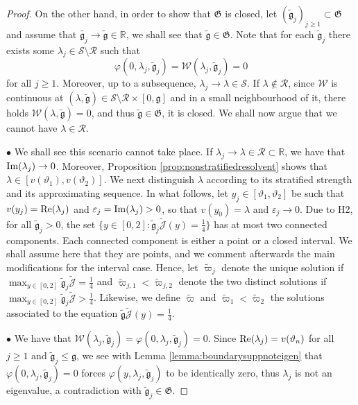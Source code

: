 \documentclass[11pt,reqno]{amsproc}
\newcommand{\bullpar}[1]{\vspace{.5em}\noindent $\bullet$ \normalfont {\bfseries #1.}}
\newcommand{\bullsubpar}[1]{\vspace{.5em} $\bullet$ \normalfont {\bfseries #1.}}
\theoremstyle{definition}
\numberwithin{equation}{section}
\newcommand{\cJ}{{\mathcal{J}}}
\newcommand{\R}{{\mathbb R}}
\newcommand{\ep}{\varepsilon}
\newcommand{\g}{{\mathfrak{g}}}
\def\Re{{\rm Re}}
\def\Im{{\rm Im}}
\begin{document}
\begin{proof}
On the other hand, in order to show that $\mathfrak{G}$ is closed, let $(\tilde{\g}_j)_{j\geq1}\subset \mathfrak{G}$ and assume that $\tilde{\g_j}\rightarrow\tilde{\g}\in \R$, we shall see that $\tilde{\g}\in \mathfrak{G}$. Note that for each $\tilde{\g}_j$ there exists some $\lambda_j\in \mathcal{S}\setminus\mathcal{R}$ such that 
\begin{equation}\label{eq:vanishingvarphilambdaj}
\varphi(0,\lambda_j, \tilde\g_j) = \mathcal{W}(\lambda_j,\tilde{\g}_j) = 0
\end{equation}
for all $j\geq 1$. Moreover, up to a subsequence, $\lambda_j\rightarrow \lambda\in \mathcal{S}$. If $\lambda\not\in \mathcal{R}$, since $\mathcal{W}$ is continuous at $(\lambda,\tilde{\g})\in\mathcal{S}\setminus\mathcal{R}\times [0,\g]$ and in a small neighbourhood of it, there holds $\mathcal{W}(\lambda,\tilde{\g}) = 0$, and thus $\tilde{\g}\in \mathfrak{G}$, it is closed. We shall now argue that we cannot have $\lambda\in \mathcal{R}$.

\bullpar{ Case $\lambda\in \mathcal{R}$ and $\tilde{\g}>0$} We shall see this scenario cannot take place. If $\lambda_j\rightarrow\lambda\in \mathcal{R}\subset \R$, we have that $\Im(\lambda_j)\rightarrow 0$. Moreover, Proposition \ref{prop:nonstratifiedresolvent} shows that $\lambda\in [v(\vartheta_1), v(\vartheta_2)]$. We next distinguish $\lambda$ according to its stratified strength and its approximating sequence. In what follows, let $y_j\in [\vartheta_1,\vartheta_2]$ be such that $v(y_j) = \Re(\lambda_j)$ and $\ep_j= \Im(\lambda_j)>0$, so that $v(y_0) = \lambda$ and $\ep_j\rightarrow 0$. Due to H2, for all $\tilde\g_j>0$, the set $\lbrace  y\in [0,2]: \tilde{\g}_j \tilde\cJ(y) = \frac14 \rbrace$ has at most two connected components. Each connected component is either a point or a closed interval. We shall assume here that they are points, and we comment afterwards the main modifications for the interval case. Hence, let $\widetilde\varpi_j$ denote the unique solution if $\max_{y\in [0,2]} \tilde\g_j\tilde\cJ = \frac14$ and $\widetilde \varpi_{j,1} < \widetilde \varpi_{j,2}$ denote the two distinct solutions if $\max_{y\in [0,2]} \tilde\g_j\tilde\cJ > \frac14$. Likewise, we define $\widetilde \varpi$ and $\widetilde \varpi_1  <  \widetilde\varpi_2$ the solutions associated to the equation $\tilde\g \widetilde\cJ(y) = \frac14$.

\bullsubpar{Case $y_0 = \vartheta_n$ and $y_j=\vartheta_n$, for $n=1,2$} We have that $\mathcal{W}(\lambda_j,\tilde\g_j) = \varphi(0,\lambda_j,\tilde\g_j) = 0$. Since $\Re(\lambda_j) = v(\vartheta_n)$ for all $j\geq 1$ and $\tilde{\g}_j\leq \g$, we see with Lemma \ref{lemma:boundarysuppnoteigen} that $\varphi(0,\lambda_j,\tilde\g_j)=0$ forces $\varphi(y,\lambda_j ,\tilde{\g}_j)$ to be identically zero, thus $\lambda_j$ is not an eigenvalue, a contradiction with $\tilde\g_j\in \mathfrak{G}$.


\end{proof}
\end{document}
